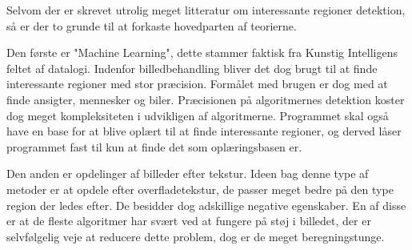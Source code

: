 {Selvom der er skrevet utrolig meget litteratur om interessante regioner
detektion, så er der to grunde til at forkaste hovedparten af teorierne.

Den første er "Machine Learning", dette stammer faktisk fra Kunstig
Intelligens feltet af datalogi. Indenfor billedbehandling bliver det dog
brugt til at finde interessante regioner med stor præcision. Formålet
med brugen er dog med at finde ansigter, mennesker og
biler\cite{ViolaJones01}\cite{SchneidermanKanade00}\cite{Gabor}. Præcisionen på
algoritmernes detektion koster dog meget kompleksiteten i udvikligen 
af algoritmerne. Programmet skal også have en base for at blive oplært
til at finde interessante regioner, og derved låser programmet fast til
kun at finde det som oplæringsbasen er.

Den anden er opdelinger af billeder efter tekstur. Ideen bag denne type
af metoder er at opdele efter
overfladetekstur\cite{218442}\cite{CarsonBelongie02}\cite{PapageorgiouPoggio}, de passer meget bedre på
den type region der ledes efter. De besidder dog adskillige
negative egenskaber. En af disse er at de fleste algoritmer har svært
ved at fungere på støj i billedet, der er selvfølgelig veje at reducere
dette problem, dog er de meget beregningstunge.\cite{PalPal}


}
